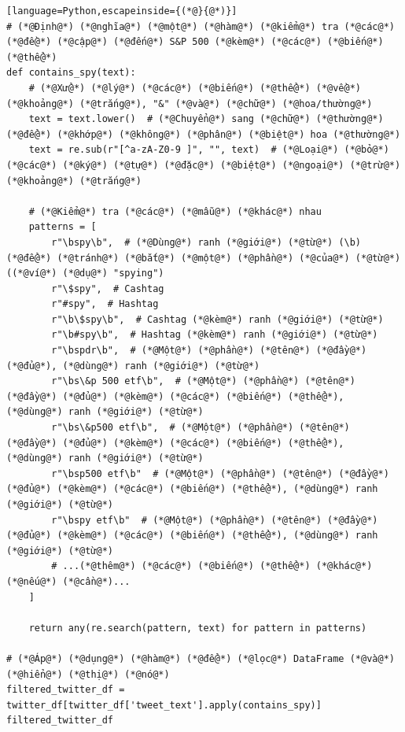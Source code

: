 \begin{lstlisting}[language=Python,escapeinside={(*@}{@*)}]
# (*@Định@*) (*@nghĩa@*) (*@một@*) (*@hàm@*) (*@kiểm@*) tra (*@các@*) (*@đề@*) (*@cập@*) (*@đến@*) S&P 500 (*@kèm@*) (*@các@*) (*@biến@*) (*@thể@*)
def contains_spy(text):
    # (*@Xử@*) (*@lý@*) (*@các@*) (*@biến@*) (*@thể@*) (*@về@*) (*@khoảng@*) (*@trắng@*), "&" (*@và@*) (*@chữ@*) (*@hoa/thường@*)
    text = text.lower()  # (*@Chuyển@*) sang (*@chữ@*) (*@thường@*) (*@để@*) (*@khớp@*) (*@không@*) (*@phân@*) (*@biệt@*) hoa (*@thường@*)
    text = re.sub(r"[^a-zA-Z0-9 ]", "", text)  # (*@Loại@*) (*@bỏ@*) (*@các@*) (*@ký@*) (*@tự@*) (*@đặc@*) (*@biệt@*) (*@ngoại@*) (*@trừ@*) (*@khoảng@*) (*@trắng@*)

    # (*@Kiểm@*) tra (*@các@*) (*@mẫu@*) (*@khác@*) nhau
    patterns = [
        r"\bspy\b",  # (*@Dùng@*) ranh (*@giới@*) (*@từ@*) (\b) (*@để@*) (*@tránh@*) (*@bắt@*) (*@một@*) (*@phần@*) (*@của@*) (*@từ@*) ((*@ví@*) (*@dụ@*) "spying")
        r"\$spy",  # Cashtag
        r"#spy",  # Hashtag
        r"\b\$spy\b",  # Cashtag (*@kèm@*) ranh (*@giới@*) (*@từ@*)
        r"\b#spy\b",  # Hashtag (*@kèm@*) ranh (*@giới@*) (*@từ@*)
        r"\bspdr\b",  # (*@Một@*) (*@phần@*) (*@tên@*) (*@đầy@*) (*@đủ@*), (*@dùng@*) ranh (*@giới@*) (*@từ@*)
        r"\bs\&p 500 etf\b",  # (*@Một@*) (*@phần@*) (*@tên@*) (*@đầy@*) (*@đủ@*) (*@kèm@*) (*@các@*) (*@biến@*) (*@thể@*), (*@dùng@*) ranh (*@giới@*) (*@từ@*)
        r"\bs\&p500 etf\b",  # (*@Một@*) (*@phần@*) (*@tên@*) (*@đầy@*) (*@đủ@*) (*@kèm@*) (*@các@*) (*@biến@*) (*@thể@*), (*@dùng@*) ranh (*@giới@*) (*@từ@*)
        r"\bsp500 etf\b"  # (*@Một@*) (*@phần@*) (*@tên@*) (*@đầy@*) (*@đủ@*) (*@kèm@*) (*@các@*) (*@biến@*) (*@thể@*), (*@dùng@*) ranh (*@giới@*) (*@từ@*)
        r"\bspy etf\b"  # (*@Một@*) (*@phần@*) (*@tên@*) (*@đầy@*) (*@đủ@*) (*@kèm@*) (*@các@*) (*@biến@*) (*@thể@*), (*@dùng@*) ranh (*@giới@*) (*@từ@*)
        # ...(*@thêm@*) (*@các@*) (*@biến@*) (*@thể@*) (*@khác@*) (*@nếu@*) (*@cần@*)...
    ]

    return any(re.search(pattern, text) for pattern in patterns)

# (*@Áp@*) (*@dụng@*) (*@hàm@*) (*@để@*) (*@lọc@*) DataFrame (*@và@*) (*@hiển@*) (*@thị@*) (*@nó@*)
filtered_twitter_df = twitter_df[twitter_df['tweet_text'].apply(contains_spy)]
filtered_twitter_df
\end{lstlisting}

